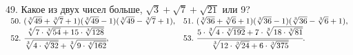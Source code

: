 49. Какое из двух чисел больше, $\sqrt{3}+\sqrt{7}+\sqrt{21}$ или 9?\\
$\begin{array}{ll}
50.\ (\sqrt[3]{49}+\sqrt[3]{7}+1)(\sqrt[3]{49}-1)(\sqrt[3]{49}-\sqrt[3]{7}+1),&
51.\ (\sqrt[3]{36}+\sqrt[3]{6}+1)(\sqrt[3]{36}-1)(\sqrt[3]{36}-\sqrt[3]{6}+1),\\
52.\ \cfrac{\sqrt[4]{7\cdot\sqrt[3]{54}+15\cdot\sqrt[3]{128}}}{\sqrt[3]{4\cdot\sqrt[4]{32}}+\sqrt[3]{9\cdot\sqrt[4]{162}}},&
53.\ \cfrac{5\cdot\sqrt[3]{4\cdot\sqrt[3]{192}}+7\cdot\sqrt[3]{18\cdot\sqrt[3]{81}}}{\sqrt[3]{12\cdot
\sqrt[3]{24}+6\cdot\sqrt[3]{375}}}.
\end{array}$
\newpage
